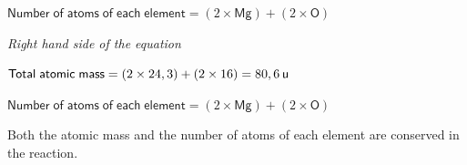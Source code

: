       \label{m38711*id64761}$\mathsf{Number\; of\; atoms\; of\; each\; element}=\left(2\ensuremath{\times}\mathsf{Mg}\right)+\left(2\ensuremath{\times}\mathsf{O}\right)$\par 
      \label{m38711*id64783}
        \textsl{Right hand side of the equation}
      \par 
      \label{m38711*id64790}$\mathsf{Total\; atomic\; mass}=\left(2\ensuremath{\times}24,3\right)+\left(2\ensuremath{\times}16\right)=80,6\phantom{\rule{2pt}{0ex}}\mathsf{u}$\par 
      \label{m38711*id64811}$\mathsf{Number\; of\; atoms\; of\; each\; element}=\left(2\ensuremath{\times}\mathsf{Mg}\right)+\left(2\ensuremath{\times}\mathsf{O}\right)$\par 
      \label{m38711*id64833}Both the atomic mass and the number of atoms of each element are conserved in the reaction.\par 
\label{m38711*secfhsst!!!underscore!!!id486}

